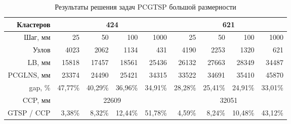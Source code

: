 \begin{table}
  \centering
  \caption{Результаты решения задач PCGTSP большой размерности}
  \label{tab:pcgtsp.ufa}
  \small
  \begin{tabular}{|r|rrrr|rrrr|}
  \hline
  Кластеров &
    \multicolumn{4}{c|}{424} &
    \multicolumn{4}{c|}{621} \\ \hline
  Шаг, мм &
    {25} &
    {50} &
    {100} &
    1000 &
    {25} &
    {50} &
    {100} &
    1000 \\ \hline
  Узлов &
    {4023} &
    {2062} &
    {1134} &
    431 &
    {4190} &
    {2253} &
    {1320} &
    621 \\ \hline
  LB, мм &
    {15818} &
    {17457} &
    {18561} &
    25436 &
    {26132} &
    {27663} &
    {28349} &
    34487 \\ \hline
  PCGLNS, мм &
    {23374} &
    {24490} &
    {25421} &
    34315 &
    {33522} &
    {34691} &
    {35410} &
    45870 \\ \hline
  gap, \% &
    {47,77\%} &
    {40,29\%} &
    {36,96\%} &
    34,91\% &
    {28,28\%} &
    {25,41\%} &
    {24,91\%} &
    33,01\% \\ \hline
  CCP, мм &
    \multicolumn{4}{c|}{22609} &
    \multicolumn{4}{c|}{32051} \\ \hline
  GTSP / CCP &
    {3,38\%} &
    {8,32\%} &
    {12,44\%} &
    51,78\% &
    {4,59\%} &
    {8,24\%} &
    {10,48\%} &
    43,12\% \\ \hline
  \end{tabular}
\end{table}
